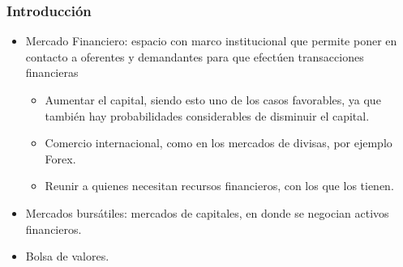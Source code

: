 \frame
{
\frametitle{Introducción}
	\begin{itemize}
		\item Mercado Financiero: espacio con marco institucional que permite poner en contacto a oferentes y demandantes para que efectúen 
			transacciones financieras
		\begin{itemize}
        		\item Aumentar el capital, siendo esto uno de los casos favorables, ya que también hay probabilidades considerables de disminuir el capital.
		        \item Comercio internacional, como en los mercados de divisas, por ejemplo Forex.
		        \item Reunir a quienes necesitan recursos financieros, con los que los tienen.
		\end{itemize}
		\item Mercados bursátiles: mercados de capitales, en donde se negocian activos financieros.
		\item Bolsa de valores.
	\end{itemize}
}
